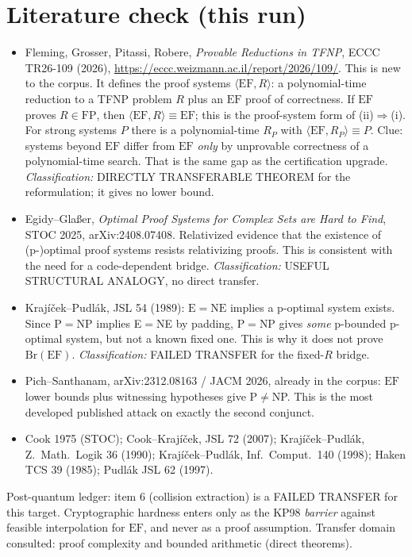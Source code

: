 \documentclass[11pt]{article}
\theoremstyle{definition}
\theoremstyle{remark}
\newcommand{\EF}{\mathrm{EF}}
\begin{document}
\section{Literature check (this run)}
\begin{itemize}
\item Fleming, Grosser, Pitassi, Robere, \emph{Provable Reductions in TFNP}, ECCC TR26-109 (2026),
  \url{https://eccc.weizmann.ac.il/report/2026/109/}. This is new to the corpus. It defines the proof
  systems $\langle\EF,R\rangle$: a polynomial-time reduction to a TFNP problem $R$ plus an $\EF$ proof
  of correctness. If $\EF$ proves $R\in\mathrm{FP}$, then $\langle\EF,R\rangle\equiv\EF$; this is the
  proof-system form of (ii)$\Rightarrow$(i). For strong systems $P$ there is a polynomial-time $R_P$
  with $\langle\EF,R_P\rangle\equiv P$. Clue: systems beyond $\EF$ differ from $\EF$ \emph{only} by
  unprovable correctness of a polynomial-time search. That is the same gap as the certification
  upgrade. \emph{Classification:} DIRECTLY TRANSFERABLE THEOREM for the reformulation;
  it gives no lower bound.
\item Egidy--Gla\ss er, \emph{Optimal Proof Systems for Complex Sets are Hard to Find}, STOC 2025,
  arXiv:2408.07408. Relativized evidence that the existence of (p-)optimal proof systems resists
  relativizing proofs. This is consistent with the need for a code-dependent bridge.
  \emph{Classification:} USEFUL STRUCTURAL ANALOGY, no direct transfer.
\item Kraj\'i\v{c}ek--Pudl\'ak, JSL 54 (1989): $\mathrm E=\mathrm{NE}$ implies a p-optimal system exists.
  Since P$=$NP implies E$=$NE by padding, P$=$NP gives \emph{some} p-bounded p-optimal system, but not
  a known fixed one. This is why it does not prove $\mathrm{Br}(\EF)$. \emph{Classification:} FAILED
  TRANSFER for the fixed-$R$ bridge.
\item Pich--Santhanam, arXiv:2312.08163 / JACM 2026, already in the corpus: $\EF$ lower bounds plus
  witnessing hypotheses give P$\ne$NP. This is the most developed published attack on exactly the
  second conjunct.
\item Cook 1975 (STOC); Cook--Kraj\'i\v{c}ek, JSL 72 (2007); Kraj\'i\v{c}ek--Pudl\'ak, Z.\ Math.\ Logik 36 (1990);
  Kraj\'i\v{c}ek--Pudl\'ak, Inf.\ Comput.\ 140 (1998); Haken TCS 39 (1985); Pudl\'ak JSL 62 (1997).
\end{itemize}
Post-quantum ledger: item 6 (collision extraction) is a FAILED TRANSFER for this target. Cryptographic
hardness enters only as the KP98 \emph{barrier} against feasible interpolation for $\EF$, and never as a
proof assumption. Transfer domain consulted: proof complexity and bounded arithmetic (direct theorems).
\end{document}
